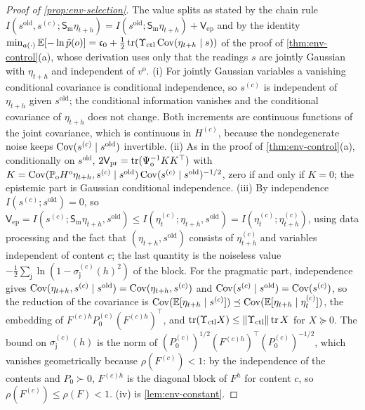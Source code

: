 \begin{proof}[Proof of \cref{prop:env-selection}]
The value splits as stated by the chain rule $I(s^{\mathrm{old}},s^{(c)};\mathsf S_{\mathrm m}\eta_{t+h})=I(s^{\mathrm{old}};\mathsf S_{\mathrm m}\eta_{t+h})+\mathsf V_{\mathrm{ep}}$ and by the identity $\min_{a(\cdot)}\mathbb{E}[-\ln\tilde p(o)]=\mathfrak c_0+\frac12\operatorname{tr}(\Upsilon_{\mathrm{ctl}}\operatorname{Cov}(\eta_{t+h}\mid s))$ of the proof of \cref{thm:env-control}(a), whose derivation uses only that the readings $s$ are jointly Gaussian with $\eta_{t+h}$ and independent of $v^{\mathrm o}$. (i) For jointly Gaussian variables a vanishing conditional covariance is conditional independence, so $s^{(c)}$ is independent of $\eta_{t+h}$ given $s^{\mathrm{old}}$; the conditional information vanishes and the conditional covariance of $\eta_{t+h}$ does not change. Both increments are continuous functions of the joint covariance, which is continuous in $H^{(c)}$, because the nondegenerate noise keeps $\operatorname{Cov}(s^{(c)}\mid s^{\mathrm{old}})$ invertible. (ii) As in the proof of \cref{thm:env-control}(a), conditionally on $s^{\mathrm{old}}$, $2\mathsf V_{\mathrm{pr}}=\operatorname{tr}(\Psi_{\mathrm o}^{-1}KK^\top)$ with $K=\operatorname{Cov}(\mathbb P_{\mathrm o}H^{\mathrm o}\eta_{t+h},s^{(c)}\mid s^{\mathrm{old}})\operatorname{Cov}(s^{(c)}\mid s^{\mathrm{old}})^{-1/2}$, zero if and only if $K=0$; the epistemic part is Gaussian conditional independence. (iii) By independence $I(s^{(c)};s^{\mathrm{old}})=0$, so $\mathsf V_{\mathrm{ep}}=I(s^{(c)};\mathsf S_{\mathrm m}\eta_{t+h},s^{\mathrm{old}})\le I(\eta^{(c)}_t;\eta_{t+h},s^{\mathrm{old}})=I(\eta^{(c)}_t;\eta^{(c)}_{t+h})$, using data processing and the fact that $(\eta_{t+h},s^{\mathrm{old}})$ consists of $\eta^{(c)}_{t+h}$ and variables independent of content $c$; the last quantity is the noiseless value $-\frac12\sum_{\mathsf j}\ln(1-\sigma^{(c)}_{\mathsf j}(h)^2)$ of the block. For the pragmatic part, independence gives $\operatorname{Cov}(\eta_{t+h},s^{(c)}\mid s^{\mathrm{old}})=\operatorname{Cov}(\eta_{t+h},s^{(c)})$ and $\operatorname{Cov}(s^{(c)}\mid s^{\mathrm{old}})=\operatorname{Cov}(s^{(c)})$, so the reduction of the covariance is $\operatorname{Cov}(\mathbb{E}[\eta_{t+h}\mid s^{(c)}])\preceq\operatorname{Cov}(\mathbb{E}[\eta_{t+h}\mid\eta^{(c)}_t])$, the embedding of $F^{(c)h}P^{(c)}_0(F^{(c)h})^\top$, and $\operatorname{tr}(\Upsilon_{\mathrm{ctl}}X)\le\Vert\Upsilon_{\mathrm{ctl}}\Vert\operatorname{tr} X$ for $X\succeq0$. The bound on $\sigma^{(c)}_{\mathsf j}(h)$ is the norm of $(P^{(c)}_0)^{1/2}(F^{(c)h})^\top(P^{(c)}_0)^{-1/2}$, which vanishes geometrically because $\rho(F^{(c)})<1$: by the independence of the contents and $P_0\succ0$, $F^{(c)h}$ is the diagonal block of $F^h$ for content $c$, so $\rho(F^{(c)})\le\rho(F)<1$. (iv) is \cref{lem:env-constant}.
\end{proof}

